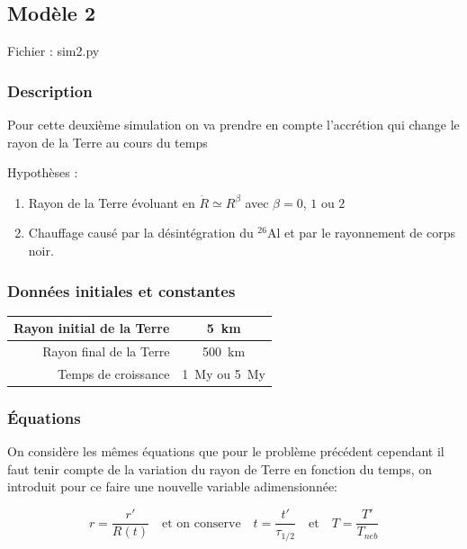 \documentclass[10pt,a4paper]{article}
\numberwithin{equation}{section}
\begin{document}
\subsection{Modèle 2}

Fichier : sim2.py

\subsubsection{Description}

Pour cette deuxième simulation on va prendre en compte l’accrétion qui change le rayon de la Terre au cours du temps

Hypothèses : 
\begin{enumerate}
\item Rayon de la Terre évoluant en $\dot{R} \simeq R^\beta$ avec $\beta = 0$, $1$ ou $2$
\item Chauffage causé par la désintégration du $^{26}$Al et par le rayonnement de corps noir.
\end{enumerate}

\subsubsection{Données initiales et constantes}

\begin{center}
  \begin{tabu}{ r  c }
    \hline
    Rayon initial de la Terre & \SI{5}{km} \\ \hline
    Rayon final de la Terre & \SI{500}{km} \\ \hline
    Temps de croissance & \SI{1}{My} ou \SI{5}{My}\\ \hline
  \end{tabu}
\end{center}

\subsubsection{Équations}

On considère les mêmes équations que pour le problème précédent cependant il faut tenir compte de la variation du rayon de Terre en fonction du temps, on introduit pour ce faire une nouvelle variable adimensionnée: 

\begin{equation}
r = \frac{ r'}{R(t)} \quad \textrm{et on conserve} \quad t = \frac{t'}{\tau_{1/2}}    \quad      \textrm{et} \quad T = \frac{T'}{T_{neb}} 
\end{equation}
\end{document}
